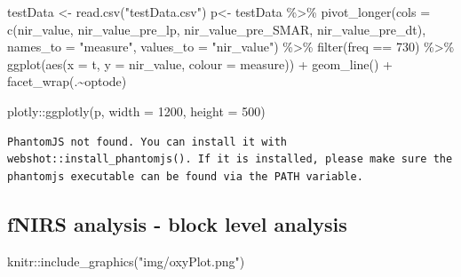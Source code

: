 \documentclass[
  letterpaper,
  DIV=11,
  numbers=noendperiod]{scrartcl}
\newenvironment{Shaded}{\begin{snugshade}}{\end{snugshade}}
\newcommand{\AttributeTok}[1]{\textcolor[rgb]{0.40,0.45,0.13}{#1}}
\newcommand{\DecValTok}[1]{\textcolor[rgb]{0.68,0.00,0.00}{#1}}
\newcommand{\FunctionTok}[1]{\textcolor[rgb]{0.28,0.35,0.67}{#1}}
\newcommand{\NormalTok}[1]{\textcolor[rgb]{0.00,0.23,0.31}{#1}}
\newcommand{\OtherTok}[1]{\textcolor[rgb]{0.00,0.23,0.31}{#1}}
\newcommand{\SpecialCharTok}[1]{\textcolor[rgb]{0.37,0.37,0.37}{#1}}
\newcommand{\StringTok}[1]{\textcolor[rgb]{0.13,0.47,0.30}{#1}}
\begin{document}
\begin{Shaded}
\begin{Highlighting}[]
\NormalTok{testData }\OtherTok{\textless{}{-}} \FunctionTok{read.csv}\NormalTok{(}\StringTok{"testData.csv"}\NormalTok{)}
\NormalTok{p}\OtherTok{\textless{}{-}}\NormalTok{ testData }\SpecialCharTok{\%\textgreater{}\%}
 \FunctionTok{pivot\_longer}\NormalTok{(}\AttributeTok{cols =} \FunctionTok{c}\NormalTok{(nir\_value, nir\_value\_pre\_lp, nir\_value\_pre\_SMAR, nir\_value\_pre\_dt), }\AttributeTok{names\_to =} \StringTok{"measure"}\NormalTok{, }\AttributeTok{values\_to =} \StringTok{"nir\_value"}\NormalTok{) }\SpecialCharTok{\%\textgreater{}\%}
\FunctionTok{filter}\NormalTok{(freq }\SpecialCharTok{==} \DecValTok{730}\NormalTok{) }\SpecialCharTok{\%\textgreater{}\%}
  \FunctionTok{ggplot}\NormalTok{(}\FunctionTok{aes}\NormalTok{(}\AttributeTok{x =}\NormalTok{ t, }\AttributeTok{y =}\NormalTok{ nir\_value, }\AttributeTok{colour =}\NormalTok{ measure)) }\SpecialCharTok{+}
 \FunctionTok{geom\_line}\NormalTok{() }\SpecialCharTok{+}
  \FunctionTok{facet\_wrap}\NormalTok{(.}\SpecialCharTok{\textasciitilde{}}\NormalTok{optode)}

\NormalTok{ plotly}\SpecialCharTok{::}\FunctionTok{ggplotly}\NormalTok{(p, }\AttributeTok{width =} \DecValTok{1200}\NormalTok{, }\AttributeTok{height =} \DecValTok{500}\NormalTok{)}
\end{Highlighting}
\end{Shaded}

\begin{verbatim}
PhantomJS not found. You can install it with webshot::install_phantomjs(). If it is installed, please make sure the phantomjs executable can be found via the PATH variable.
\end{verbatim}

\hypertarget{fnirs-analysis---block-level-analysis}{%
\subsection{fNIRS analysis - block level
analysis}\label{fnirs-analysis---block-level-analysis}}

\begin{Shaded}
\begin{Highlighting}[]
\NormalTok{knitr}\SpecialCharTok{::}\FunctionTok{include\_graphics}\NormalTok{(}\StringTok{"img/oxyPlot.png"}\NormalTok{)}
\end{Highlighting}
\end{Shaded}
\end{document}
